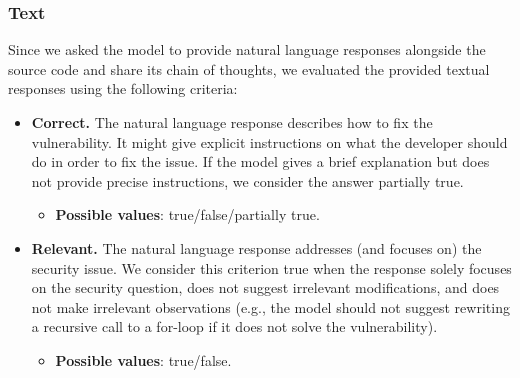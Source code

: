 \subsubsection{Text}

Since we asked the model to provide natural language responses  alongside the source code and share its chain of thoughts, we evaluated the provided textual responses using the following criteria:

\begin{itemize}


\item \textbf{Correct.}  The natural language response describes how to fix the vulnerability. It might give explicit instructions on what the developer should do in order to fix the issue. If the model gives a brief explanation but does not provide precise instructions, we consider the answer partially true.
\begin{itemize}
	\item \textbf{Possible values}: true/false/partially true.
\end{itemize}

\item \textbf{Relevant.} The natural language response addresses (and focuses on) the security issue. 
We consider this criterion true when the response solely focuses on the security question, does not suggest irrelevant modifications, and does not make irrelevant observations (e.g., the model should not suggest rewriting a recursive call to a for-loop if it does not solve the vulnerability).
\begin{itemize}
	\item \textbf{Possible values}: true/false.
\end{itemize}


\end{itemize} %


